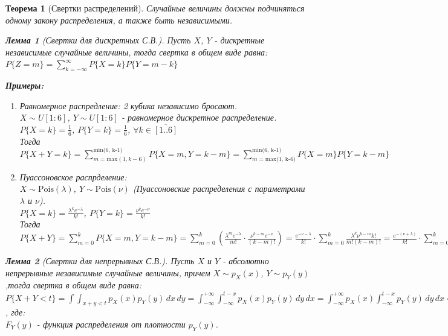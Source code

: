 \documentclass[14pt]{extarticle}
\theoremstyle{breakstyle}
\newtheorem{theorem}{Теорема}[subsection]
\newtheorem{lemma}{Лемма}[subsection]
\begin{document}
\begin{theorem}[Свертки распределений]

Случайные величины должны подчиняться одному закону распределения, а также быть независимыми.

\begin{lemma}[Свертки для дискретных С.В.]
Пусть $X$, $Y$ - дискретные независимые случайные величины, тогда свертка в общем виде равна:\\
$P\{Z = m\} = \sum_{k=-\infty}^{\infty}P\{X=k\}P\{Y=m-k\}$

\vspace{\baselineskip}

\textbf{Примеры:}
\begin{enumerate}
    \item Равномерное распредление: 2 кубика независимо бросают.\\
          $X \sim U[1:6]$, $Y \sim U[1:6]$ - равномерное дискретное распределение.\\
          $P\{X=k\} = \frac{1}{6}$, $P\{Y=k\} = \frac{1}{6}$, $\forall k \in \overline{[1..6]}$\\
          Тогда $P\{X+Y=k\} = \sum_{m = \text{max}(1, k-6)}^{\text{min(6, k-1)}}P\{X=m, Y=k-m\}=\sum_{m = \text{max(1, k-6)}}^{\text{min(6, k-1)}}P\{X=m\}P\{Y=k-m\}$

    \item Пуассоновское распрделение: \\
          $X \sim \text{Pois}(\lambda)$, $Y \sim \text{Pois}(\nu)$ (Пуассоновские распределения с параметрами $\lambda$ и $\nu$).\\
          $P\{X=k\} = \frac{\lambda^{k} e^{-\lambda}}{k!}$, $P\{Y=k\} = \frac{\nu^{k}e^{-\nu}}{k!}$\\
          Тогда $P\{X+Y\} = \sum_{m=0}^{k}P\{X=m, Y=k-m\} = \sum_{m=0}^{k}(\frac{\lambda^{m}e^{-\lambda}}{m!} \cdot \frac{\nu ^ {k - m} e^{-\nu}}{(k-m)!}) = \frac{e^{-\nu-\lambda}}{k!} \cdot \sum_{m=0}^{k}\frac{\lambda^{k}\nu^{k-m}k!}{m!(k-m)!} = \frac{e^{-(\nu + \lambda)}}{k!} \cdot \sum_{m = 0}^{k}C_{k}^{m}\lambda^{m}\nu^{k-m} = \frac{e^{-(\nu + \lambda)}}{k!}(\lambda + \nu)^{k}$

\end{enumerate}

\end{lemma}

\begin{lemma}[Свертки для непрерывных С.В.]
Пусть $X$ и $Y$ - абсолютно непрерывные независимые случайные величины, причем $X \sim p_{X}(x)$, $Y \sim p_{Y}(y)$,тогда свертка в общем виде равна:\\
$P\{X+Y < t\} = \int \int_{x+y < t} p_{X}(x)p_{Y}(y) \, dx \, dy = \int_{-\infty}^{+\infty} \int_{-\infty}^{t-x}p_{X}(x)p_{Y}(y) \, dy \, dx = \int_{-\infty}^{+\infty} p_{X}(x) \int_{-\infty}^{t-x}p_{Y}(y) \, dy \, dx = \int_{-\infty}^{+\infty} p_{X}(x)F_{Y}(t-x) \, dx$, где:\\
$F_{Y}(y)$ - функция распределения от плотности $p_{Y}(y)$.


\end{lemma}
\end{theorem}
\end{document}
